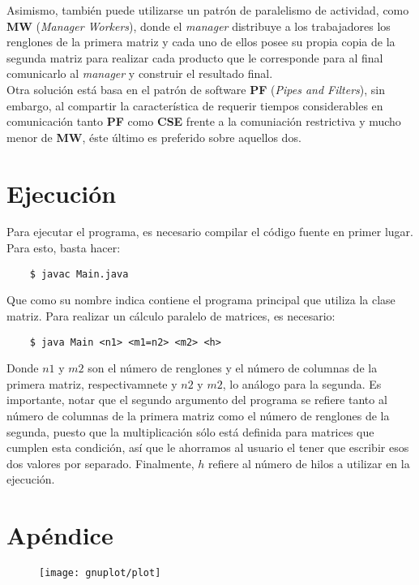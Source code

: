 \documentclass[12pt]{article}
\begin{document}
\begin{enumerate}[label=(\alph*)]
  Asimismo, también puede utilizarse un patrón de paralelismo de actividad, como \textbf{MW} (\textit{Manager Workers}), donde el \textit{manager} distribuye a los trabajadores los renglones de la primera matriz y cada uno de ellos posee su propia copia de la segunda matriz para realizar cada producto que le corresponde para al final comunicarlo al \textit{manager} y construir el resultado final.\\
  Otra solución está basa en el patrón de software \textbf{PF} (\textit{Pipes and Filters}), sin embargo, al compartir la característica de requerir tiempos considerables en comunicación tanto \textbf{PF} como \textbf{CSE} frente a la comuniación restrictiva y mucho menor de \textbf{MW}, éste último es preferido sobre aquellos dos.
\end{enumerate}
\section{Ejecución}
Para ejecutar el programa, es necesario compilar el código fuente en primer lugar. Para esto, basta hacer:
\begin{verbatim}
    $ javac Main.java
\end{verbatim}
Que como su nombre indica contiene el programa principal que utiliza la clase matriz.
Para realizar un cálculo paralelo de matrices, es necesario:
\begin{verbatim}
    $ java Main <n1> <m1=n2> <m2> <h>
\end{verbatim}
Donde $n1$ y $m2$ son el número de renglones y el número de columnas de la primera matriz, respectivamnete y $n2$ y $m2$, lo análogo para la segunda. Es importante, notar que el segundo argumento del programa se refiere tanto al número de columnas de la primera matriz como el número de renglones de la segunda, puesto que la multiplicación sólo está definida para matrices que cumplen esta condición, así que
le ahorramos al usuario el tener que escribir esos dos valores por separado. Finalmente, $h$ refiere al número de hilos a utilizar en la ejecución.

\section{Apéndice}
\begin{figure}[H]
  \centering
  \texttt{[image: gnuplot/plot]}
\end{figure}
\end{document}
